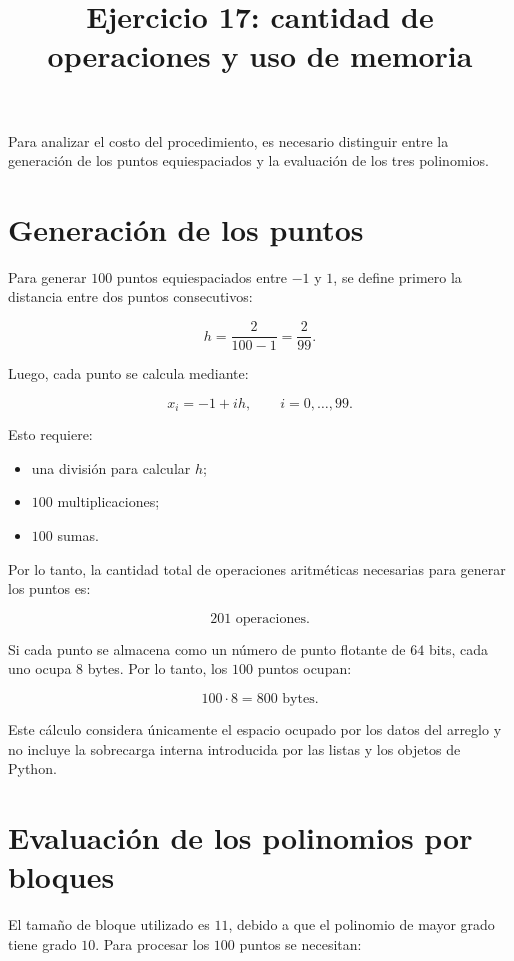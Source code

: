 \documentclass[12pt,a4paper]{article}
\title{Ejercicio 17: cantidad de operaciones y uso de memoria}
\author{}
\date{}
\begin{document}
\maketitle

Para analizar el costo del procedimiento, es necesario distinguir entre la generación de los puntos equiespaciados y la evaluación de los tres polinomios.

\section*{Generación de los puntos}

Para generar $100$ puntos equiespaciados entre $-1$ y $1$, se define primero la distancia entre dos puntos consecutivos:

\[
h = \frac{2}{100-1} = \frac{2}{99}.
\]

Luego, cada punto se calcula mediante:

\[
x_i = -1 + i h,
\qquad i=0,\ldots,99.
\]

Esto requiere:

\begin{itemize}
    \item una división para calcular $h$;
    \item $100$ multiplicaciones;
    \item $100$ sumas.
\end{itemize}

Por lo tanto, la cantidad total de operaciones aritméticas necesarias para generar los puntos es:

\[
\boxed{201\text{ operaciones}}.
\]

Si cada punto se almacena como un número de punto flotante de $64$ bits, cada uno ocupa $8$ bytes. Por lo tanto, los $100$ puntos ocupan:

\[
100 \cdot 8 = \boxed{800\text{ bytes}}.
\]

Este cálculo considera únicamente el espacio ocupado por los datos del arreglo y no incluye la sobrecarga interna introducida por las listas y los objetos de Python.

\section*{Evaluación de los polinomios por bloques}

El tamaño de bloque utilizado es $11$, debido a que el polinomio de mayor grado tiene grado $10$. Para procesar los $100$ puntos se necesitan:
\end{document}

